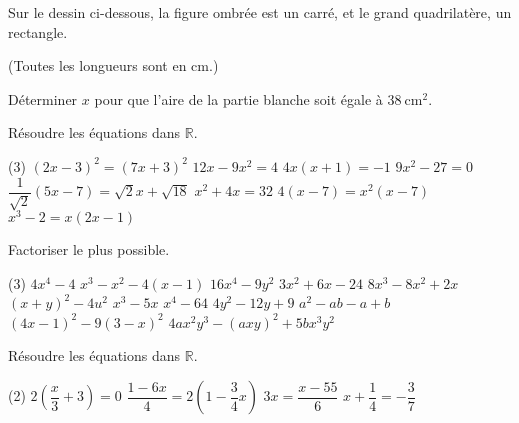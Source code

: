 \documentclass[a4paper,12pt]{report}
\begin{document}
\begin{exo}[1]
Sur le dessin ci-dessous, la figure ombrée est un carré, et le grand quadrilatère, un rectangle.

(Toutes les longueurs sont en cm.)

\hfill
\begin{minipage}[t]{0.5\textwidth}{
\vspace{0pt}
}
\end{minipage}
\begin{minipage}[t]{0.4\textwidth}{
\vspace{0pt}
Déterminer $x$ pour que l'aire de la partie blanche soit égale à $38 \mathrm{~cm}^2$.
}
\end{minipage}

\end{exo}
\newpage
\begin{exo}[3]
 Résoudre les équations dans $\mathbb{R}$.
	\begin{tasks}(3)
\task $(2 x-3)^2=(7 x+3)^2$
\task $12 x-9 x^2=4$
\task $4 x(x+1)=-1$
\task $9 x^2-27=0$
\task $\dfrac{1}{\sqrt{2}}(5 x-7)=\sqrt{2} x+\sqrt{18}$
\task $x^2+4 x=32$
\task $4(x-7)=x^2(x-7)$
\task $x^3-2=x(2 x-1)$
	\end{tasks}
\end{exo}

\begin{exo}
Factoriser le plus possible.
	\begin{tasks}(3)
\task $4 x^4-4$
\task $x^3-x^2-4(x-1)$
\task $16 x^4-9 y^2$
\task $3 x^2+6 x-24$
\task $8 x^3-8 x^2+2 x$
\task $(x+y)^2-4 u^2$
\task $x^3-5 x$
\task $x^4-64$
\task $4 y^2-12 y+9$
\task $a^2-a b-a+b$
\task $(4 x-1)^2-9(3-x)^2$
\task $4 a x^2 y^3-(a x y)^2+5 b x^3 y^2$
	\end{tasks}
\end{exo}
\begin{exo}
Résoudre les équations dans $\mathbb{R}$.
	\begin{tasks}(2)
\task $2\left(\dfrac{x}{3}+3\right)=0$
\task $\dfrac{1-6 x}{4}=2\left(1-\dfrac{3}{4} x\right)$
\task $3 x=\dfrac{x-55}{6}$
\task $x+\dfrac{1}{4}=-\dfrac{3}{7}$
	\end{tasks}
\end{exo}
\end{document}
